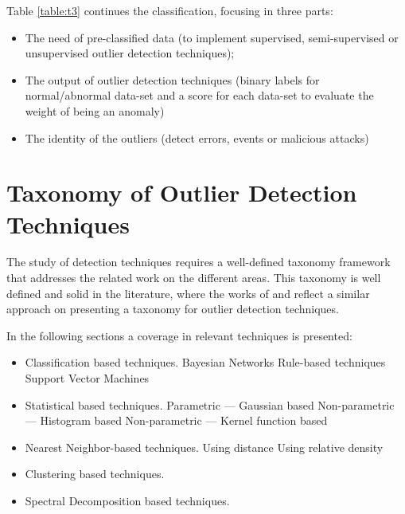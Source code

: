 Table \ref{table:t3} continues the classification, focusing in three parts: 
\begin{itemize}
		\setlength\itemsep{-0.5em}
		\item The need of pre-classified data (to implement supervised, semi-supervised or unsupervised outlier detection techniques);
		
		\item The output of outlier detection techniques (binary labels for normal/abnormal data-set and a score for each data-set to evaluate the weight of being an anomaly)
		
		\item The identity of the outliers (detect errors, events or malicious attacks)
\end{itemize}

\newpage



\vspace{2em}



\section{Taxonomy of Outlier Detection Techniques}
\label{sec:taxon}
The study of detection techniques requires a well-defined taxonomy framework that addresses the related work on the different areas. This taxonomy is well defined and solid in the literature, where the works of \cite{gen:zhang:2010} and \cite{gen:chandola:2009} reflect a similar approach on presenting a taxonomy for outlier detection techniques.

In the following sections a coverage in relevant techniques is presented:

\begin{itemize}
	\setlength\itemsep{-0.5em}
	\item Classification based techniques.
	\subitem Bayesian Networks
	\subitem Rule-based techniques
	\subitem Support Vector Machines
	
	\item Statistical based techniques.
	\subitem Parametric --- Gaussian based
	\subitem Non-parametric --- Histogram based
	\subitem Non-parametric --- Kernel function based
	
	\item Nearest Neighbor-based techniques.
	\subitem Using distance
	\subitem Using relative density
	
	\item Clustering based techniques.
	
	\item Spectral Decomposition based techniques.
	
\end{itemize}












